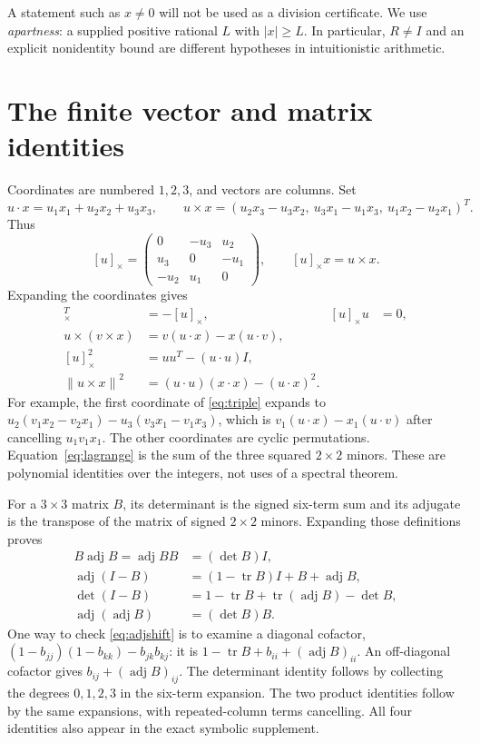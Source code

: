 \documentclass[11pt]{article}
\theoremstyle{definition}\newtheorem{definition}[theorem]{Definition}
\newcommand{\tr}{\operatorname{tr}}\newcommand{\adj}{\operatorname{adj}}
\newcommand{\norm}[1]{\left\lVert#1\right\rVert}
\newcommand{\crossmat}[1]{[#1]_{\times}}
\begin{document}
A statement such as $x\ne0$ will not be used as a division certificate.
We use \emph{apartness}: a supplied positive rational $L$ with $|x|\ge L$.
In particular, $R\ne I$ and an explicit nonidentity bound are different
hypotheses in intuitionistic arithmetic.

\section{The finite vector and matrix identities}\label{sec:finite}

Coordinates are numbered $1,2,3$, and vectors are columns. Set
\[
 u\cdot x=u_1x_1+u_2x_2+u_3x_3,\qquad
 u\times x=(u_2x_3-u_3x_2,\ u_3x_1-u_1x_3,\ u_1x_2-u_2x_1)^T.
\]
Thus
\begin{equation}\label{eq:crossmatrix}
 \crossmat u=\begin{pmatrix}0&-u_3&u_2\\u_3&0&-u_1\\-u_2&u_1&0\end{pmatrix},
 \qquad \crossmat u x=u\times x.
\end{equation}
Expanding the coordinates gives
\begin{align}
 \crossmat u^T&=-\crossmat u,&
 \crossmat u u&=0,\label{eq:k-basic}\\
 u\times(v\times x)&=v(u\cdot x)-x(u\cdot v),\label{eq:triple}\\
 \crossmat u^2&=uu^T-(u\cdot u)I,\label{eq:k-square}\\
 \norm{u\times x}^2&=(u\cdot u)(x\cdot x)-(u\cdot x)^2.\label{eq:lagrange}
\end{align}
For example, the first coordinate of \eqref{eq:triple} expands to
$u_2(v_1x_2-v_2x_1)-u_3(v_3x_1-v_1x_3)$, which is
$v_1(u\cdot x)-x_1(u\cdot v)$ after cancelling $u_1v_1x_1$.
The other coordinates are cyclic permutations. Equation~\eqref{eq:lagrange}
is the sum of the three squared $2\times2$ minors. These are polynomial
identities over the integers, not uses of a spectral theorem.

For a $3\times3$ matrix $B$, its determinant is the signed six-term sum and
its adjugate is the transpose of the matrix of signed $2\times2$ minors.
Expanding those definitions proves
\begin{align}
 B\adj B=\adj B B&=(\det B)I,\label{eq:adjproduct}\\
 \adj(I-B)&=(1-\tr B)I+B+\adj B,\label{eq:adjshift}\\
 \det(I-B)&=1-\tr B+\tr(\adj B)-\det B,\label{eq:detshift}\\
 \adj(\adj B)&=(\det B)B.\label{eq:adjadj}
\end{align}
One way to check \eqref{eq:adjshift} is to examine a diagonal cofactor,
$(1-b_{jj})(1-b_{kk})-b_{jk}b_{kj}$: it is
$1-\tr B+b_{ii}+(\adj B)_{ii}$. An off-diagonal cofactor gives
$b_{ij}+(\adj B)_{ij}$. The determinant identity follows by collecting
the degrees $0,1,2,3$ in the six-term expansion. The two product identities
follow by the same expansions, with repeated-column terms cancelling.
All four identities also appear in the exact symbolic supplement.
\end{document}
